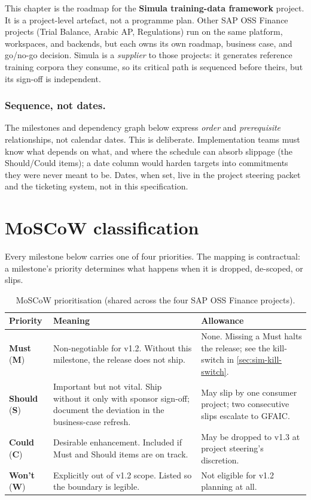 \documentclass[12pt,a4paper,twoside]{report}
\begin{document}
This chapter is the roadmap for the \textbf{Simula training-data
framework} project. It is a project-level artefact, not a programme
plan. Other SAP OSS Finance projects (Trial Balance, Arabic AP,
Regulations) run on the same platform, workspaces, and backends, but
each owns its own roadmap, business case, and go/no-go decision.
Simula is a \emph{supplier} to those projects: it generates reference
training corpora they consume, so its critical path is sequenced
before theirs, but its sign-off is independent.

\subsubsection{Sequence, not dates.}
The milestones and dependency graph below express \emph{order} and
\emph{prerequisite} relationships, not calendar dates. This is
deliberate. Implementation teams must know what depends on what, and
where the schedule can absorb slippage (the Should/Could items); a
date column would harden targets into commitments they were never
meant to be. Dates, when set, live in the project steering packet and
the ticketing system, not in this specification.

\section{MoSCoW classification}\label{sec:sim-moscow}

Every milestone below carries one of four priorities. The mapping is
contractual: a milestone's priority determines what happens when it is
dropped, de-scoped, or slips.

\begin{table}[htbp]
\centering
\caption{MoSCoW prioritisation (shared across the four SAP OSS Finance
projects).}
\label{tab:sim-moscow}
\footnotesize
\begin{tabularx}{\linewidth}{@{}l l X@{}}
\toprule
\textbf{Priority} & \textbf{Meaning} & \textbf{Allowance} \\ \midrule
\textbf{Must} (\textbf{M}) & Non-negotiable for v1.2. Without this milestone, the release does not ship. & None. Missing a Must halts the release; see the kill-switch in \cref{sec:sim-kill-switch}. \\
\textbf{Should} (\textbf{S}) & Important but not vital. Ship without it only with sponsor sign-off; document the deviation in the business-case refresh. & May slip by one consumer project; two consecutive slips escalate to GFAIC. \\
\textbf{Could} (\textbf{C}) & Desirable enhancement. Included if Must and Should items are on track. & May be dropped to v1.3 at project steering's discretion. \\
\textbf{Won't} (\textbf{W}) & Explicitly out of v1.2 scope. Listed so the boundary is legible. & Not eligible for v1.2 planning at all. \\
\bottomrule
\end{tabularx}
\end{table}
\end{document}
